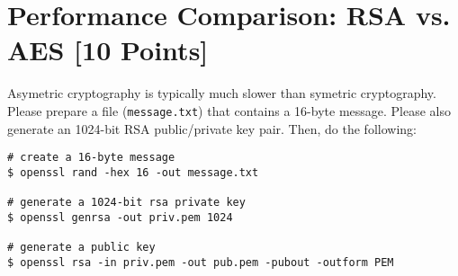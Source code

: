 \documentclass[11pt]{article}
\begin{document}
\medskip

\section{Performance Comparison: RSA vs. AES [10 Points]}
Asymetric cryptography is typically much slower than symetric cryptography. Please prepare a file (\texttt{message.txt})
that contains a 16-byte message. Please also generate an 1024-bit RSA public/private key pair. Then, do the
following:

\begin{verbatim}
# create a 16-byte message
$ openssl rand -hex 16 -out message.txt

# generate a 1024-bit rsa private key
$ openssl genrsa -out priv.pem 1024

# generate a public key
$ openssl rsa -in priv.pem -out pub.pem -pubout -outform PEM
\end{verbatim}
\end{document}
